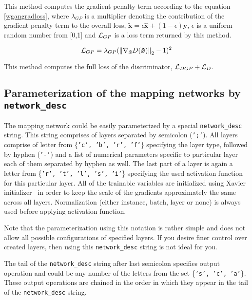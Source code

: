 \begin{itemize}
\begin{description}
 This method computes the gradient penalty term according to the equation \ref{wgangradloss}, where $\lambda_{GP}$ is a multiplier denoting the contribution of the gradient penalty term to the overall loss, $\bm{\tilde{x}} = \epsilon\bm{\hat{x}} + (1-\epsilon)\bm{y}$, $\epsilon$ is a uniform random number from [0,1] and $\mathcal{L}_{GP}$ is a loss term returned by this method.

\begin{equation}
\mathcal{L}_{GP} = \lambda_{GP}(\left\lVert\nabla_{\bm{\tilde{x}}}D(\bm{\tilde{x}})\right\rVert_2 - 1)^2
\label{wgangradloss}
\end{equation}

 This method computes the full loss of the discriminator, $\mathcal{L}_{DGP} + \mathcal{L}_D$.
\end{description}
\end{itemize}

\subsection[Parameterization of the mapping networks]{Parameterization of the mapping networks by \texttt{network\_desc}} \label{networkdesc}
The mapping network could be easily parameterized by a special \texttt{network\_desc} string. This string comprises of layers separated by semicolon (\texttt{';'}). All layers comprise of letter from \{\texttt{'c', 'b', 'r', 'f'}\} specifying the layer type, followed by hyphen (\texttt{'-'}) and a list of numerical parameters specific to particular layer each of them separated by hyphen as well. The last part of a layer is again a letter from \{\texttt{'r', 't', 'l', 's', 'i'}\} specifying the used activation function for this particular layer. All of the trainable variables are initialized using Xavier initializer~\cite{xavier} in order to keep the scale of the gradients approximately the same across all layers. Normalization (either instance, batch, layer or none) is always used before applying activation function.

Note that the parameterization using this notation is rather simple and does not allow all possible configurations of specified layers. If you desire finer control over created layers, then using this \texttt{network\_desc} string is not ideal for you.

The tail of the \texttt{network\_desc} string after last semicolon specifies output operation and could be any number of the letters from the set \{\texttt{'s', 'c', 'a'}\}. These output operations are chained in the order in which they appear in the tail of the \texttt{network\_desc} string.

